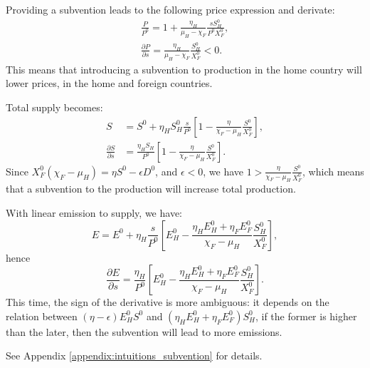 Providing a subvention leads to the following price expression and derivate:
\begin{align*}
\frac{P}{P^0} = 1 + \frac{\eta_H}{\mu_H - \chi_F} \frac{s S_H^0}{P^0 X_F^0}, \\
\frac{\partial P}{\partial s} = \frac{\eta_H}{\mu_H - \chi_F} \frac{S_H^0}{X_F^0} < 0.
\end{align*}
This means that introducing a subvention to production in the home country will lower prices, in the home and foreign countries.

Total supply becomes:
\begin{align*}
S &= S^0 + \eta_H S_H^0 \frac{s}{P^0} \left[ 1 - \frac{\eta}{\chi_F - \mu_H} \frac{S^0}{X_F^0} \right], \\
\frac{\partial S}{\partial s} &= \frac{\eta_H S_H}{P^0}\left[ 1 - \frac{\eta}{\chi_F - \mu_H} \frac{S^0}{X_F^0} \right].
\end{align*}
Since $X_F^0(\chi_F - \mu_H) = \eta S^0 - \epsilon D^0$, and $\epsilon < 0$, we have $1 > \frac{\eta}{\chi_F - \mu_H} \frac{S^0}{X_F^0}$, which means that a subvention to the production will increase total production.

With linear emission to supply, we have:
$$ 
E = E^0 + \eta_H \frac{s}{P^0} \left[ E_H^0 - \frac{\eta_H E_H^0 + \eta_F E_F^0}{\chi_F - \mu_H} \frac{S_H^0}{X_F^0} \right],
$$ 
hence 
$$
\frac{\partial E}{\partial s} = \frac{\eta_H}{P^0} \left[ E_H^0 - \frac{\eta_H E_H^0 + \eta_F E_F^0}{\chi_F - \mu_H} \frac{S_H^0}{X_F^0} \right].
$$
This time, the sign of the derivative is more ambiguous: it depends on the relation between $(\eta - \epsilon)E_H^0 S^0$ and $(\eta_H E_H^0 + \eta_F E_F^0) S_H^0$, if the former is higher than the later, then the subvention will lead to more emissions.

See Appendix \ref{appendix:intuitions_subvention} for details.

